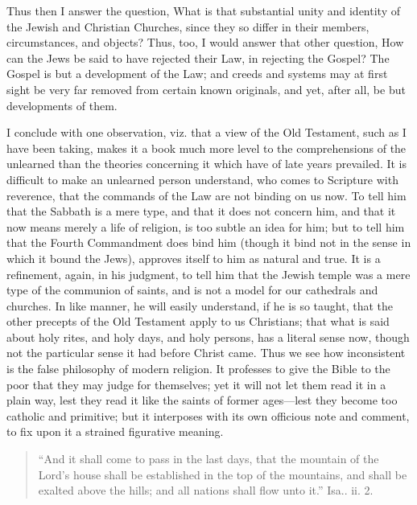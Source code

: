 Thus then I answer the question, What is that substantial unity and
identity of the Jewish and Christian Churches, since they so differ in
their members, circumstances, and objects? Thus, too, I would answer
that other question, How can the Jews be said to have rejected their
Law, in rejecting the Gospel? The Gospel is but a development of the
Law; and creeds and systems may at first sight be very far removed
from certain known originals, and yet, after all, be but developments
of them.

I conclude with one observation, viz. that a view of the Old
Testament, such as I have been taking, makes it a book much more level
to the comprehensions of the unlearned than the theories concerning it
which have of late years prevailed. It is difficult to make an
unlearned person understand, who comes to Scripture with reverence,
that the commands of the Law are not binding on us now. To tell him
that the Sabbath is a mere type, and that it does not concern him, and
that it now means merely a life of religion, is too subtle an idea for
him; but to tell him that the Fourth Commandment does bind him (though
it bind not in the sense in which it bound the Jews), approves itself
to him as natural and true. It is a refinement, again, in his
judgment, to tell him that the Jewish temple was a mere type of the
communion of saints, and is not a model for our cathedrals and
churches. In like manner, he will easily understand, if he is so
taught, that the other precepts of the Old Testament apply to us
Christians; that what is said about holy rites, and holy days, and
holy persons, has a literal sense now, though not the particular sense
it had before Christ came. Thus we see how inconsistent is the false
philosophy of modern religion. It professes to give the Bible to the
poor that they may judge for themselves; yet it will not let them read
it in a plain way, lest they read it like the saints of former ages—lest
they become too catholic and primitive; but it interposes with its own
officious note and comment, to fix upon it a strained figurative
meaning.


\begin{quote}

``And it shall come to pass in the last days, that the
mountain of the Lord's house shall be established in the top of the
mountains, and shall be exalted above the hills; and all nations
shall flow unto it.'' Isa.. ii. 2.

\end{quote}

